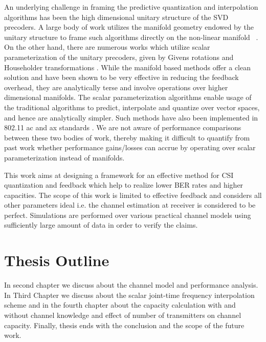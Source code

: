 \documentclass[11pt,a4paper]{report}
\begin{document}
An underlying challenge in framing the predictive quantization and interpolation algorithms has been the high dimensional unitary structure of the SVD precoders. A large body of work utilizes the manifold geometry endowed by the unitary structure to frame such algorithms directly on the non-linear manifold ~\cite{schwarz2013adaptive,5946308,6891198,Gupt1905:Predictive,pitaval2013codebooks}. On the other hand, there are numerous works which utilize scalar parameterization of the unitary precoders, given by Givens rotations and Householder transformations \cite{4114278,4556174,lou2013comparison}. While the manifold based methods offer a clean solution and have been shown to be very effective in reducing the feedback overhead, they are analytically terse and
involve operations over higher dimensional manifolds. The scalar parameterization algorithms enable usage of the traditional algorithms to predict, interpolate and quantize over vector spaces, and hence are analytically simpler.
Such methods have also been implemented in 802.11 ac and ax standards
\cite{lou2013comparison,ieee80211}. We are not aware of performance comparisons
between these two bodies of work, thereby making it difficult to
quantify from past work whether performance gains/losses can accrue by operating over scalar parameterization instead of manifolds.

This work aims at designing a framework for an effective method for CSI quantization
and feedback which help to realize lower BER rates and higher capacities. The scope 
of this work is limited to effective feedback and considers all other parameters
ideal i.e. the channel estimation at receiver is considered to be perfect. Simulations
are performed over various practical channel models using sufficiently large amount
of data in order to verify the claims.
\section{Thesis Outline}
In second chapter we discuss about the channel model and performance analysis. 
In Third Chapter we discuss about the scalar joint-time frequency interpolation
scheme and in the fourth chapter about the capacity calculation with and 
without channel knowledge and effect of number of transmitters on channel capacity.
Finally, thesis ends with the conclusion and the scope of the future work.

\end{document}
